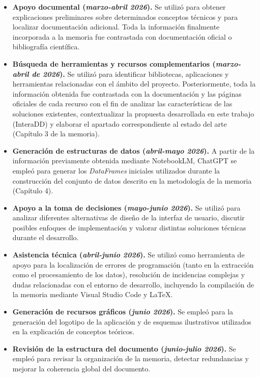 \begin{itemize}
    \item \textbf{Apoyo documental (\textit{marzo-abril 2026}).} Se utilizó para obtener explicaciones preliminares sobre determinados conceptos técnicos y para localizar documentación adicional. Toda la información finalmente incorporada a la memoria fue contrastada con documentación oficial o bibliografía científica.
    \item \textbf{Búsqueda de herramientas y recursos complementarios (\textit{marzo-abril de 2026}).} Se utilizó para identificar bibliotecas, aplicaciones y herramientas relacionadas con el ámbito del proyecto. Posteriormente, toda la información obtenida fue contrastada con la documentación y las páginas oficiales de cada recurso con el fin de analizar las características de las soluciones existentes, contextualizar la propuesta desarrollada en este trabajo (InteraDD) y elaborar el apartado correspondiente al estado del arte (Capítulo 3 de la memoria).
    \item \textbf{Generación de estructuras de datos (\textit{abril-mayo 2026}).} A partir de la información previamente obtenida mediante NotebookLM, ChatGPT se empleó para generar los \textit{DataFrames} iniciales utilizados durante la construcción del conjunto de datos descrito en la metodología de la memoria (Capítulo 4).
    \item \textbf{Apoyo a la toma de decisiones (\textit{mayo-junio 2026}).} Se utilizó para analizar diferentes alternativas de diseño de la interfaz de usuario, discutir posibles enfoques de implementación y valorar distintas soluciones técnicas durante el desarrollo.
    \item \textbf{Asistencia técnica (\textit{abril-junio 2026}).} Se utilizó como herramienta de apoyo para la localización de errores de programación (tanto en la extracción como el procesamiento de los datos), resolución de incidencias complejas y dudas relacionadas con el entorno de desarrollo, incluyendo la compilación de la memoria mediante Visual Studio Code y LaTeX.
    \item \textbf{Generación de recursos gráficos (\textit{junio 2026}).} Se empleó para la generación del logotipo de la aplicación y de esquemas ilustrativos utilizados en la explicación de conceptos teóricos.
    \item \textbf{Revisión de la estructura del documento (\textit{junio-julio 2026}).} Se empleó para revisar la organización de la memoria, detectar redundancias y mejorar la coherencia global del documento.
\end{itemize}

